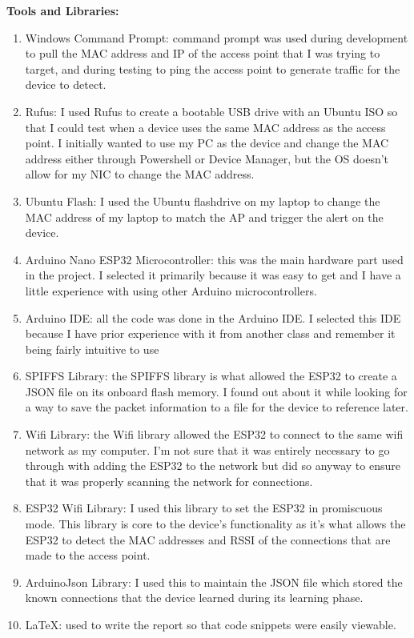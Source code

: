\documentclass[letterpaper, 11pt]{article}
\newcommand{\secHeader}[1]{\vspace{2mm} \noindent \textbf{#1:}\vspace{-4mm}}
\begin{document}
\secHeader{Tools and Libraries}
\vspace{5mm}
\begin{enumerate}
    \item Windows Command Prompt: command prompt was used during development to pull the MAC address and IP of the access point that I was trying to target, and during testing to 
    ping the access point to generate traffic for the device to detect.
    \item Rufus: I used Rufus to create a bootable USB drive with an Ubuntu ISO so that I could test when a device uses the same MAC address as the access point. I initially wanted to use
    my PC as the device and change the MAC address either through Powershell or Device Manager, but the OS doesn't allow for my NIC to change the MAC address.
    \item Ubuntu Flash: I used the Ubuntu flashdrive on my laptop to change the MAC address of my laptop to match the AP and trigger the alert on the device.
    \item Arduino Nano ESP32 Microcontroller: this was the main hardware part used in the project. I selected it primarily because it was easy to get and I have a little experience with using other 
    Arduino microcontrollers.
    \item Arduino IDE: all the code was done in the Arduino IDE. I selected this IDE because I have prior experience with it from another class and remember it being fairly intuitive to use
    \item SPIFFS Library: the SPIFFS library is what allowed the ESP32 to create a JSON file on its onboard flash memory. I found out about it while looking for a way to save the packet information
    to a file for the device to reference later.
    \item Wifi Library: the Wifi library allowed the ESP32 to connect to the same wifi network as my computer. I'm not sure that it was entirely necessary to go through with adding the ESP32 to the 
    network but did so anyway to ensure that it was properly scanning the network for connections.
    \item ESP32 Wifi Library: I used this library to set the ESP32 in promiscuous mode. This library is core to the device's functionality as it's what allows the ESP32 to detect the 
    MAC addresses and RSSI of the connections that are made to the access point.
    \item ArduinoJson Library: I used this to maintain the JSON file which stored the known connections that the device learned during its learning phase.
    \item LaTeX: used to write the report so that code snippets were easily viewable.
\end{enumerate}
\end{document}
